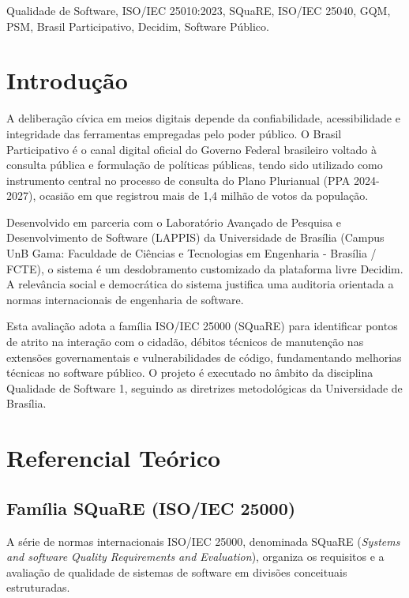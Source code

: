 \documentclass[journal]{IEEEtran}
\begin{document}
\begin{IEEEkeywords}
Qualidade de Software, ISO/IEC 25010:2023, SQuaRE, ISO/IEC 25040, GQM, PSM, Brasil Participativo, Decidim, Software Público.
\end{IEEEkeywords}

\section{Introdução}
\label{sec:introducao}

A deliberação cívica em meios digitais depende da confiabilidade, acessibilidade e integridade das ferramentas empregadas pelo poder público. O Brasil Participativo é o canal digital oficial do Governo Federal brasileiro voltado à consulta pública e formulação de políticas públicas, tendo sido utilizado como instrumento central no processo de consulta do Plano Plurianual (PPA 2024-2027), ocasião em que registrou mais de 1,4 milhão de votos da população.

Desenvolvido em parceria com o Laboratório Avançado de Pesquisa e Desenvolvimento de Software (LAPPIS) da Universidade de Brasília (Campus UnB Gama: Faculdade de Ciências e Tecnologias em Engenharia - Brasília / FCTE), o sistema é um desdobramento customizado da plataforma livre Decidim. A relevância social e democrática do sistema justifica uma auditoria orientada a normas internacionais de engenharia de software. 

Esta avaliação adota a família ISO/IEC 25000 (SQuaRE) para identificar pontos de atrito na interação com o cidadão, débitos técnicos de manutenção nas extensões governamentais e vulnerabilidades de código, fundamentando melhorias técnicas no software público. O projeto é executado no âmbito da disciplina Qualidade de Software 1, seguindo as diretrizes metodológicas da Universidade de Brasília.

\section{Referencial Teórico}
\label{sec:referencial}

\subsection{Família SQuaRE (ISO/IEC 25000)}
\label{sec:square}

A série de normas internacionais ISO/IEC 25000, denominada SQuaRE (\textit{Systems and software Quality Requirements and Evaluation}), organiza os requisitos e a avaliação de qualidade de sistemas de software em divisões conceituais estruturadas. 
\end{document}
